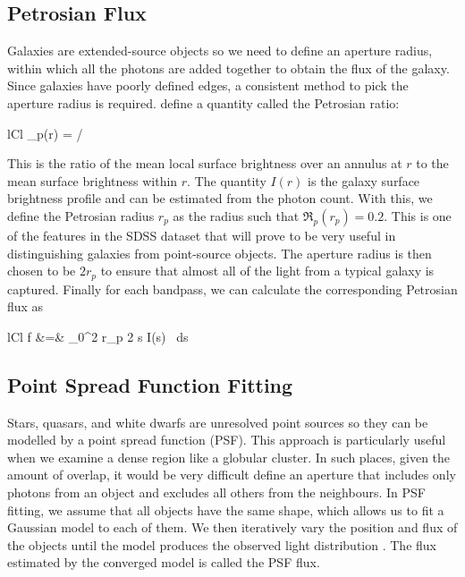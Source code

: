 \subsection{Petrosian Flux}
Galaxies are extended-source objects so we need to define an aperture radius, within which
all the photons are added together to obtain the flux of the galaxy. Since galaxies have
poorly defined edges, a consistent method to pick the aperture radius is required.
 define a quantity called the Petrosian ratio:
	\begin{IEEEeqnarray*}{lCl}
		_p(r) = 
							\bigg/ 
	\end{IEEEeqnarray*}
This is the ratio of the mean local surface brightness over an annulus at $r$ to the mean
surface brightness within $r$. The quantity $I(r)$ is the galaxy surface brightness profile
and can be estimated from the photon count. With this, we define the Petrosian
radius $r_p$ as the radius such that $\mathfrak{R}_p(r_p) = 0.2$. This is one of the features
in the SDSS dataset that will prove to be very useful in distinguishing galaxies from
point-source objects. The aperture radius is then chosen to be $2r_p$ to ensure that almost
all of the light from a typical galaxy is captured. Finally for each bandpass, we can calculate
the corresponding Petrosian flux as
	\begin{IEEEeqnarray*}{lCl}
		f &=& \int_{0}^{2 r_p} 2 \pi s I(s) \, ds
	\end{IEEEeqnarray*}

\subsection{Point Spread Function Fitting}
Stars, quasars, and white dwarfs are unresolved point sources so they can be modelled by a point
spread function (PSF). This approach is particularly useful when we examine a dense region
like a globular cluster. In such places, given the amount of overlap, it would be very
difficult define an aperture that includes only photons from an object and excludes all others
from the neighbours. In PSF fitting, we assume that all objects have the same shape, which allows
us to fit a Gaussian model to each of them. We then iteratively vary the position and flux
of the objects until the model produces the observed light distribution \cite[Chapter 10]{palmer01}.
The flux estimated by the converged model is called the PSF flux.


